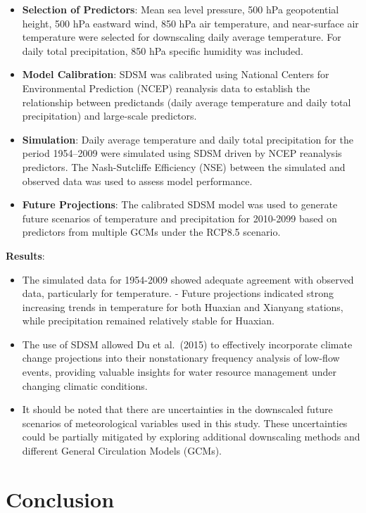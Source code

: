 \documentclass[
]{krantz}
\providecommand{\tightlist}{%
  \setlength{\itemsep}{0pt}\setlength{\parskip}{0pt}}
\begin{document}
\begin{itemize}
\item
  \textbf{Selection of Predictors}: Mean sea level pressure, 500 hPa geopotential height, 500 hPa eastward wind, 850 hPa air temperature, and near-surface air temperature were selected for downscaling daily average temperature. For daily total precipitation, 850 hPa specific humidity was included.
\item
  \textbf{Model Calibration}: SDSM was calibrated using National Centers for Environmental Prediction (NCEP) reanalysis data to establish the relationship between predictands (daily average temperature and daily total precipitation) and large-scale predictors.
\item
  \textbf{Simulation}: Daily average temperature and daily total precipitation for the period 1954--2009 were simulated using SDSM driven by NCEP reanalysis predictors. The Nash-Sutcliffe Efficiency (NSE) between the simulated and observed data was used to assess model performance.
\item
  \textbf{Future Projections}: The calibrated SDSM model was used to generate future scenarios of temperature and precipitation for 2010-2099 based on predictors from multiple GCMs under the RCP8.5 scenario.
\end{itemize}

\textbf{Results}:

\begin{itemize}
\tightlist
\item
  The simulated data for 1954-2009 showed adequate agreement with observed data, particularly for temperature. - Future projections indicated strong increasing trends in temperature for both Huaxian and Xianyang stations, while precipitation remained relatively stable for Huaxian.
\item
  The use of SDSM allowed Du et al.~(2015) to effectively incorporate climate change projections into their nonstationary frequency analysis of low-flow events, providing valuable insights for water resource management under changing climatic conditions.
\item
  It should be noted that there are uncertainties in the downscaled future scenarios of meteorological variables used in this study. These uncertainties could be partially mitigated by exploring additional downscaling methods and different General Circulation Models (GCMs).
\end{itemize}

\section{Conclusion}\label{conclusion-2}
\end{document}
